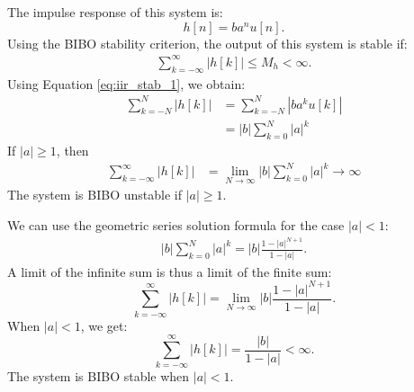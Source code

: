 The impulse response of this system is:
\begin{equation}
    h[n] = b a^n u[n].
    \label{eq:iir_stab_1}
\end{equation}
Using the BIBO stability criterion, the output of this system is
stable if:
\begin{align}
    \sum_{k=-\infty}^{\infty} |h[k]| \le M_h < \infty.
\end{align}
Using Equation \ref{eq:iir_stab_1}, we obtain:
\begin{align}
    \sum_{k=-N}^{N} |h[k]| & = \sum_{k=-N}^{N} |b a^k u[k]| \\
                           & = |b| \sum_{k=0}^{N}|a|^k
\end{align}
If $|a|\ge 1$, then
\begin{align}
    \sum_{k=-\infty}^{\infty} |h[k]| & = \lim_{N\rightarrow \infty} |b| \sum_{k=0}^{N}|a|^k \rightarrow \infty
\end{align}
The system is BIBO unstable if $|a| \ge 1$.

We can use the geometric series solution formula for the case $|a| < 1$:
\begin{align}
    |b| \sum_{k=0}^{N}|a|^k = |b| \frac{1-|a|^{N+1}}{1-|a|}.
\end{align}
A limit of the infinite sum is thus a limit of the finite sum:
\begin{equation}
    \sum_{k=-\infty}^{\infty} |h[k]| = \lim_{N\rightarrow \infty} |b|\frac{1-|a|^{N+1}}{1-|a|}.
\end{equation}
When $|a|<1$, we get:
\begin{equation}
    \sum_{k=-\infty}^{\infty} |h[k]| = \frac{|b|}{1-|a|} < \infty.
\end{equation}
The system is BIBO stable when $|a|<1$.

